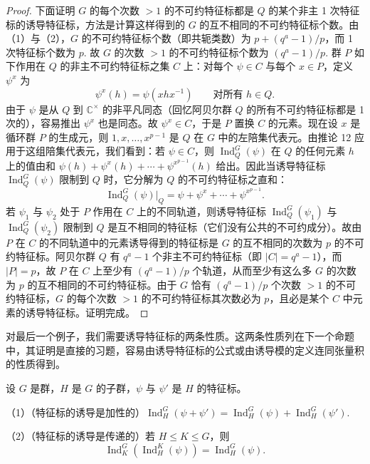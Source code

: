 \begin{proof}
下面证明 \(G\) 的每个次数 \(> 1\) 的不可约特征标都是 \(Q\) 的某个非主 1 次特征标的诱导特征标，方法是计算这样得到的 \(G\) 的互不相同的不可约特征标个数。由（1）与（2），\(G\) 的不可约特征标个数（即共轭类数）为 \(p+(q^a-1)/p\)，而 1 次特征标个数为 \(p\). 故 \(G\) 的次数 \(> 1\) 的不可约特征标个数为 \((q^a-1)/p\). 群 \(P\) 如下作用在 \(Q\) 的非主不可约特征标之集 \(C\) 上：对每个 \(\psi \in C\) 与每个 \(x \in P\)，定义 \(\psi^x\) 为
\[
\psi^x(h) = \psi(xhx^{-1}) \qquad \text{对所有 } h \in Q.
\]
由于 \(\psi\) 是从 \(Q\) 到 \(\mathbb{C}^\times\) 的非平凡同态（回忆阿贝尔群 \(Q\) 的所有不可约特征标都是 1 次的），容易推出 \(\psi^x\) 也是同态。故 \(\psi^x \in C\)，于是 \(P\) 置换 \(C\) 的元素。现在设 \(x\) 是循环群 \(P\) 的生成元，则 \(1, x, \ldots, x^{p-1}\) 是 \(Q\) 在 \(G\) 中的左陪集代表元。由推论 12 应用于这组陪集代表元，我们看到：若 \(\psi \in C\)，则 \(\operatorname{Ind}_Q^G(\psi)\) 在 \(Q\) 的任何元素 \(h\) 上的值由和 \(\psi(h)+\psi^x(h)+\cdots+\psi^{x^{p-1}}(h)\) 给出。因此当诱导特征标 \(\operatorname{Ind}_Q^G(\psi)\) 限制到 \(Q\) 时，它分解为 \(Q\) 的不可约特征标之直和：
\[
\operatorname{Ind}_Q^G(\psi)|_Q = \psi+\psi^x+\cdots+\psi^{x^{p-1}}.
\]
若 \(\psi_1\) 与 \(\psi_2\) 处于 \(P\) 作用在 \(C\) 上的不同轨道，则诱导特征标 \(\operatorname{Ind}_Q^G(\psi_1)\) 与 \(\operatorname{Ind}_Q^G(\psi_2)\) 限制到 \(Q\) 是互不相同的特征标（它们没有公共的不可约成分）。故由 \(P\) 在 \(C\) 的不同轨道中的元素诱导得到的特征标是 \(G\) 的互不相同的次数为 \(p\) 的不可约特征标。阿贝尔群 \(Q\) 有 \(q^a-1\) 个非主不可约特征标（即 \(|C| = q^a-1\)），而 \(|P| = p\)，故 \(P\) 在 \(C\) 上至少有 \((q^a-1)/p\) 个轨道，从而至少有这么多 \(G\) 的次数为 \(p\) 的互不相同的不可约特征标。由于 \(G\) 恰有 \((q^a-1)/p\) 个次数 \(> 1\) 的不可约特征标，\(G\) 的每个次数 \(> 1\) 的不可约特征标其次数必为 \(p\)，且必是某个 \(C\) 中元素的诱导特征标。证明完成。
\end{proof}

对最后一个例子，我们需要诱导特征标的两条性质。这两条性质列在下一个命题中，其证明是直接的习题，容易由诱导特征标的公式或由诱导模的定义连同张量积的性质得到。

\begin{proposition}\label{pro:19.14}
设 \(G\) 是群，\(H\) 是 \(G\) 的子群，\(\psi\) 与 \(\psi'\) 是 \(H\) 的特征标。

（1）（特征标的诱导是加性的）\(\operatorname{Ind}_H^G(\psi+\psi') = \operatorname{Ind}_H^G(\psi)+\operatorname{Ind}_H^G(\psi')\).

（2）（特征标的诱导是传递的）若 \(H \leq K \leq G\)，则
\[
\operatorname{Ind}_K^G(\operatorname{Ind}_H^K(\psi)) = \operatorname{Ind}_H^G(\psi).
\]
\end{proposition}

